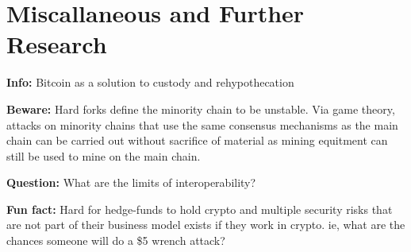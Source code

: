 \documentclass[10pt,twocolumn]{article}
\begin{document}
\section{Miscallaneous and Further Research}
\textbf{Info:} Bitcoin as a solution to custody and rehypothecation

\textbf{Beware:} Hard forks define the minority chain to be unstable. Via game
theory, attacks on minority chains that use the same consensus mechanisms as the
main chain can be carried out without sacrifice of material as mining equitment
can still be used to mine on the main chain. 

\textbf{Question:} What are the limits of interoperability? 

\textbf{Fun fact:} Hard for hedge-funds to hold crypto and multiple security risks
that are not part of their business model exists if they work in crypto. ie,
what are the chances someone will do a \$5 wrench attack?
\end{document}

